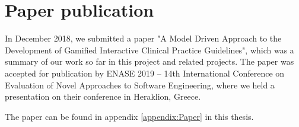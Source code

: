 
\section{Paper publication}
In December 2018, we submitted a paper "A Model Driven Approach to the Development of Gamified Interactive Clinical Practice Guidelines", which was a summary of our work so far in this project and related projects. The paper was accepted for publication by ENASE 2019 – 14th International Conference on Evaluation of Novel Approaches to Software Engineering, where we held a presentation on their conference in Heraklion, Greece. 

The paper can be found in appendix \ref{appendix:Paper} in this thesis.



	
	
	

